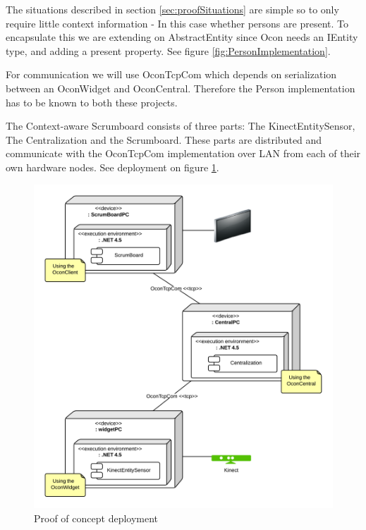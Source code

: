 \documentclass[../report.tex]{subfiles}
\begin{document}
The situations described in section \ref{sec:proofSituations} are simple so to only require little context information - In this case whether persons are present. To encapsulate this we are extending on AbstractEntity since Ocon needs an IEntity type, and adding a present property. See figure \ref{fig:PersonImplementation}. 


For communication we will use OconTcpCom which depends on serialization between an OconWidget and OconCentral. Therefore the Person implementation has to be known to both these projects.



The Context-aware Scrumboard consists of three parts: The KinectEntitySensor, The Centralization and the Scrumboard. These parts are distributed and communicate with the OconTcpCom implementation over LAN from each of their own hardware nodes. See deployment on figure \ref{fig:ProofofConceptDeployment}.


\begin{figure}[H]
\begin{center}
\includegraphics[scale=0.155]{./ProofOfConceptDeployment.png}
\caption{Proof of concept deployment}
\end{center}
\label{fig:ProofofConceptDeployment}
\end{figure}
\end{document}

